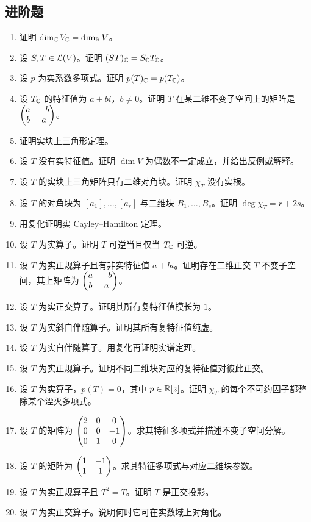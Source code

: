 \subsection*{进阶题}
\begin{enumerate}[resume, label=\textbf{\arabic*.}, leftmargin=*, itemsep=0.5em]
\item \medium 证明 $\dim_{\mathbb{C}} V_{\mathbb{C}}=\dim_{\mathbb{R}} V$。
\item \medium 设 $S,T\in\mathcal{L}(V)$。证明 $(ST)_{\mathbb{C}}=S_{\mathbb{C}} T_{\mathbb{C}}$。
\item \medium 设 $p$ 为实系数多项式。证明 $p(T)_{\mathbb{C}}=p(T_{\mathbb{C}})$。
\item \medium 设 $T_{\mathbb{C}}$ 的特征值为 $a\pm bi$，$b\neq0$。证明 $T$ 在某二维不变子空间上的矩阵是 $\begin{pmatrix} a&-b\\b&a \end{pmatrix}$。
\item \medium 证明实块上三角形定理。
\item \medium 设 $T$ 没有实特征值。证明 $\dim V$ 为偶数不一定成立，并给出反例或解释。
\item \medium 设 $T$ 的实块上三角矩阵只有二维对角块。证明 $\chi_T$ 没有实根。
\item \medium 设 $T$ 的对角块为 $[a_1],\dots,[a_r]$ 与二维块 $B_1,\dots,B_s$。证明 $\deg\chi_T=r+2s$。
\item \medium 用复化证明实 Cayley--Hamilton 定理。
\item \medium 设 $T$ 为实算子。证明 $T$ 可逆当且仅当 $T_{\mathbb{C}}$ 可逆。
\item \medium 设 $T$ 为实正规算子且有非实特征值 $a+bi$。证明存在二维正交 $T$-不变子空间，其上矩阵为 $\begin{pmatrix} a&-b\\b&a \end{pmatrix}$。
\item \medium 设 $T$ 为实正交算子。证明其所有复特征值模长为 $1$。
\item \medium 设 $T$ 为实斜自伴随算子。证明其所有复特征值纯虚。
\item \medium 设 $T$ 为实自伴随算子。用复化再证明实谱定理。
\item \medium 设 $T$ 为实正规算子。证明不同二维块对应的复特征值对彼此正交。
\item \medium 设 $T$ 为实算子，$p(T)=0$，其中 $p\in\mathbb{R}[z]$。证明 $\chi_T$ 的每个不可约因子都整除某个湮灭多项式。
\item \medium 设 $T$ 的矩阵为 $\begin{pmatrix} 2&0&0\\0&0&-1\\0&1&0 \end{pmatrix}$。求其特征多项式并描述不变子空间分解。
\item \medium 设 $T$ 的矩阵为 $\begin{pmatrix} 1&-1\\1&1 \end{pmatrix}$。求其特征多项式与对应二维块参数。
\item \medium 设 $T$ 为实正规算子且 $T^2=T$。证明 $T$ 是正交投影。
\item \medium 设 $T$ 为实正交算子。说明何时它可在实数域上对角化。
\end{enumerate}

